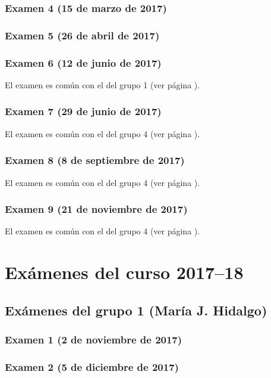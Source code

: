 \documentclass[a4paper,12pt,twoside]{book}
\begin{document}
\subsection{Examen 4 (15 de marzo de 2017)}
\subsection{Examen 5 (26 de abril de 2017)}
\subsection{Examen 6 (12 de junio de 2017)} 
El examen es común con el del grupo 1 (ver página \pageref{examen_16_17_1_6}).
\subsection{Examen 7 (29 de junio de 2017)}
El examen es común con el del grupo 4 (ver página \pageref{examen_16_17_4_7}).
\subsection{Examen 8 (8 de septiembre de 2017)}
El examen es común con el del grupo 4 (ver página \pageref{examen_16_17_4_8}).
\subsection{Examen 9 (21 de noviembre de 2017)}
El examen es común con el del grupo 4 (ver página \pageref{examen_16_17_4_9}).

\chapter{Exámenes del curso 2017--18}

\section{Exámenes del grupo 1 (María J. Hidalgo)}
\subsection{Examen 1 (2 de noviembre de 2017)}
\subsection{Examen 2 (5 de diciembre de 2017)}
\end{document}
